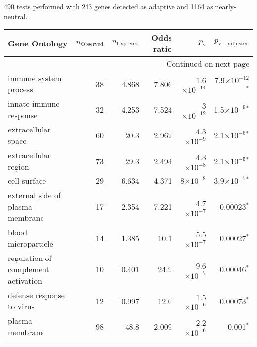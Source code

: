 490 tests performed with 243 genes detected as adaptive and 1164 as nearly-neutral.
\scriptsize
\begin{longtable}{|l|r|r|r|r|r|}
\toprule
                                Gene Ontology & $n_{\mathrm{Observed}}$ & $n_{\mathrm{Expected}}$ & Odds ratio &     $p_{\mathrm{v}}$ &      $p_{\mathrm{v-adjusted}}$ \\
\midrule
\endhead
\midrule
\multicolumn{6}{r}{{Continued on next page}} \\
\midrule
\endfoot

\bottomrule
\endlastfoot
                        immune system process &                      38 &                   4.868 &      7.806 & 1.6$\times 10^{-14}$ &  7.9$\times 10^{-12}$$\bm{^*}$ \\
                       innate immune response &                      32 &                   4.253 &      7.524 &   3$\times 10^{-12}$ &   1.5$\times 10^{-9}$$\bm{^*}$ \\
                          extracellular space &                      60 &                    20.3 &      2.962 &  4.3$\times 10^{-9}$ &   2.1$\times 10^{-6}$$\bm{^*}$ \\
                         extracellular region &                      73 &                    29.3 &      2.494 &  4.3$\times 10^{-8}$ &   2.1$\times 10^{-5}$$\bm{^*}$ \\
                                 cell surface &                      29 &                   6.634 &      4.371 &    8$\times 10^{-8}$ &   3.9$\times 10^{-5}$$\bm{^*}$ \\
             external side of plasma membrane &                      17 &                   2.354 &      7.221 &  4.7$\times 10^{-7}$ &               0.00023$\bm{^*}$ \\
                          blood microparticle &                      14 &                   1.385 &       10.1 &  5.5$\times 10^{-7}$ &               0.00027$\bm{^*}$ \\
          regulation of complement activation &                      10 &                   0.401 &       24.9 &  9.6$\times 10^{-7}$ &               0.00046$\bm{^*}$ \\
                    defense response to virus &                      12 &                   0.997 &       12.0 &  1.5$\times 10^{-6}$ &               0.00073$\bm{^*}$ \\
                              plasma membrane &                      98 &                    48.8 &      2.009 &  2.2$\times 10^{-6}$ &                 0.001$\bm{^*}$ \\
$$
\end{longtable}

